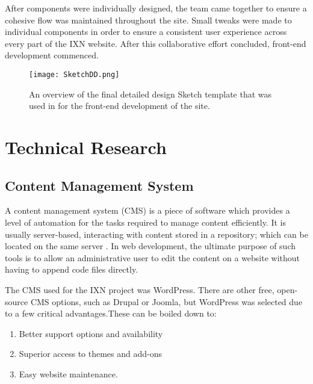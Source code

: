 \documentclass[fontsize=11pt]{extarticle}
\numberwithin{figure}{section} %
\numberwithin{table}{section}%
\providecommand{\tightlist}{%
  \setlength{\itemsep}{0pt}\setlength{\parskip}{0pt}}
\begin{document}
After components were individually designed, the team came together to
ensure a cohesive flow was maintained throughout the site. Small tweaks
were made to individual components in order to ensure a consistent user
experience across every part of the IXN website. After this
collaborative effort concluded, front-end development commenced.

\begin{figure}[H]
\centering
\texttt{[image: SketchDD.png]}
\caption{An overview of the final detailed design Sketch template that was used in for the front-end development of the site.}
\label{sketchdd}
\end{figure}

\newpage

\hypertarget{technical-research}{%
\section{Technical Research}\label{technical-research}}

\hypertarget{content-management-system}{%
\subsection{Content Management System}\label{content-management-system}}

A content management system (CMS) is a piece of software which provides
a level of automation for the tasks required to manage content
efficiently. It is usually server-based, interacting with content stored
in a repository; which can be located on the same server \cite{p1}. In
web development, the ultimate purpose of such tools is to allow an
administrative user to edit the content on a website without having to
append code files directly.

The CMS used for the IXN project was WordPress. There are other free,
open-source CMS options, such as Drupal or Joomla, but WordPress was
selected due to a few critical advantages.These can be boiled down to:

\begin{enumerate}

\tightlist
\item
  Better support options and availability
\item
  Superior access to themes and add-ons
\item
  Easy website maintenance.
\end{enumerate}
\end{document}
